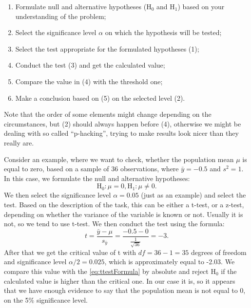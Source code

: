 \documentclass[
]{book}
\providecommand{\tightlist}{%
  \setlength{\itemsep}{0pt}\setlength{\parskip}{0pt}}
\theoremstyle{definition}
\theoremstyle{definition}
\theoremstyle{definition}
\theoremstyle{definition}
\theoremstyle{remark}
\begin{document}
\begin{enumerate}
\def\labelenumi{\arabic{enumi}.}
\tightlist
\item
  Formulate null and alternative hypotheses (\(\mathrm{H}_0\) and \(\mathrm{H}_1\)) based on your understanding of the problem;
\item
  Select the significance level \(\alpha\) on which the hypothesis will be tested;
\item
  Select the test appropriate for the formulated hypotheses (1);
\item
  Conduct the test (3) and get the calculated value;
\item
  Compare the value in (4) with the threshold one;
\item
  Make a conclusion based on (5) on the selected level (2).
\end{enumerate}

Note that the order of some elements might change depending on the circumstances, but (2) should always happen before (4), otherwise we might be dealing with so called ``p-hacking'', trying to make results look nicer than they really are.

Consider an example, where we want to check, whether the population mean \(\mu\) is equal to zero, based on a sample of 36 observations, where \(\bar{y}=-0.5\) and \(s^2=1\). In this case, we formulate the null and alternative hypotheses:
\begin{equation*}
    \mathrm{H}_0: \mu=0, \mathrm{H}_1: \mu \neq 0.
\end{equation*}
We then select the significance level \(\alpha=0.05\) (just as an example) and select the test. Based on the description of the task, this can be either a t-test, or a z-test, depending on whether the variance of the variable is known or not. Usually it is not, so we tend to use t-test. We then conduct the test using the formula:
\begin{equation}
    t = \frac{\bar{y} - \mu}{s_{\bar{y}}} = \frac{-0.5 - 0}{\frac{1}{\sqrt{36}}} = -3 .
    \label{eq:ttestFormula}
\end{equation}
After that we get the critical value of t with \(df=36-1=35\) degrees of freedom and significance level \(\alpha/2=0.025\), which is approximately equal to -2.03. We compare this value with the \eqref{eq:ttestFormula} by absolute and reject \(\mathrm{H}_0\) if the calculated value is higher than the critical one. In our case it is, so it appears that we have enough evidence to say that the population mean is not equal to 0, on the 5\% significance level.
\end{document}
